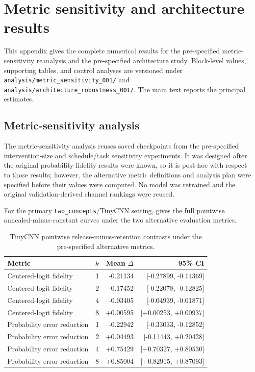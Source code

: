 \section{Metric sensitivity and architecture results}\label{app:final-robustness}

This appendix gives the complete numerical results for the pre-specified metric-sensitivity reanalysis and the pre-specified architecture study. Block-level values, supporting tables, and control analyses are versioned under \texttt{analysis/metric\_sensitivity\_001/} and \texttt{analysis/architecture\_robustness\_001/}. The main text reports the principal estimates.

\subsection{Metric-sensitivity analysis}\label{app:metric-sensitivity}

The metric-sensitivity analysis reuses saved checkpoints from the pre-specified intervention-size and schedule/task sensitivity experiments. It was designed after the original probability-fidelity results were known, so it is post-hoc with respect to those results; however, the alternative metric definitions and analysis plan were specified before their values were computed. No model was retrained and the original validation-derived channel rankings were reused.

For the primary \texttt{two\_concepts}/TinyCNN setting,  gives the full pointwise annealed-minus-constant curves under the two alternative evaluation metrics.

\begin{table}[h]
\caption{TinyCNN pointwise release-minus-retention contrasts under the pre-specified alternative metrics.}
\label{tab:app-metric-pointwise}
\centering
\small
\begin{tabular}{lrrr}
\toprule
Metric & $k$ & Mean $\Delta$ & 95\% CI \\
\midrule
Centered-logit fidelity & 1 & -0.21134 & [-0.27899, -0.14369] \\
Centered-logit fidelity & 2 & -0.17452 & [-0.22078, -0.12825] \\
Centered-logit fidelity & 4 & -0.03405 & [-0.04939, -0.01871] \\
Centered-logit fidelity & 8 & +0.00595 & [+0.00253, +0.00937] \\
\addlinespace[2pt]
Probability error reduction & 1 & -0.22942 & [-0.33033, -0.12852] \\
Probability error reduction & 2 & +0.04493 & [-0.11443, +0.20428] \\
Probability error reduction & 4 & +0.75429 & [+0.70327, +0.80530] \\
Probability error reduction & 8 & +0.85004 & [+0.82915, +0.87093] \\
\bottomrule
\end{tabular}
\end{table}

